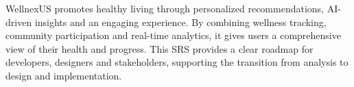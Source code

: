 \documentclass[11pt,a4paper]{report}
\begin{document}
WellnexUS promotes healthy living through personalized recommendations, AI-driven insights and an engaging experience. By combining wellness tracking, community participation and real-time analytics, it gives users a comprehensive view of their health and progress. This SRS provides a clear roadmap for developers, designers and stakeholders, supporting the transition from analysis to design and implementation.
\end{document}
